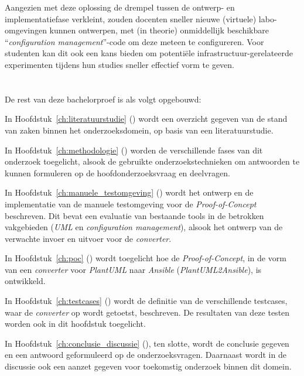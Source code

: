 Aangezien met deze oplossing de drempel tussen de ontwerp- en implementatiefase verkleint, zouden docenten sneller nieuwe (virtuele) labo-omgevingen kunnen ontwerpen, met (in theorie) onmiddellijk beschikbare ``\emph{configuration management}''-code om deze meteen te configureren. Voor studenten kan dit ook een kans bieden om potentiële infrastructuur-gerelateerde experimenten tijdens hun studies sneller effectief vorm te geven.

\section{}%
\label{sec:inl_opzet-bachelorproef}


De rest van deze bachelorproef is als volgt opgebouwd:

In Hoofdstuk~\ref{ch:literatuurstudie} () wordt een overzicht gegeven van de stand van zaken binnen het onderzoeksdomein, op basis van een literatuurstudie.

In Hoofdstuk~\ref{ch:methodologie} () worden de verschillende fases van dit onderzoek toegelicht, alsook de gebruikte onderzoekstechnieken om antwoorden te kunnen formuleren op de hoofdonderzoeksvraag en deelvragen.


In Hoofdstuk~\ref{ch:manuele_testomgeving} () wordt het ontwerp en de implementatie van de manuele testomgeving voor de \emph{Proof-of-Concept} beschreven. Dit bevat een evaluatie van bestaande tools in de betrokken vakgebieden (\emph{UML} en \emph{configuration management}), alsook het ontwerp van de verwachte invoer en uitvoer voor de \emph{converter}.

In Hoofdstuk~\ref{ch:poc} () wordt toegelicht hoe de \emph{Proof-of-Concept}, in de vorm van een \emph{converter} voor \emph{PlantUML} naar \emph{Ansible} (\emph{PlantUML2Ansible}), is ontwikkeld.

In Hoofdstuk~\ref{ch:testcases} () wordt de definitie van de verschillende testcases, waar de \emph{converter} op wordt getoetst, beschreven. De resultaten van deze testen worden ook in dit hoofdstuk toegelicht.

In Hoofdstuk~\ref{ch:conclusie_discussie} (), ten slotte, wordt de conclusie gegeven en een antwoord geformuleerd op de onderzoeksvragen. Daarnaast wordt in de discussie ook een aanzet gegeven voor toekomstig onderzoek binnen dit domein.